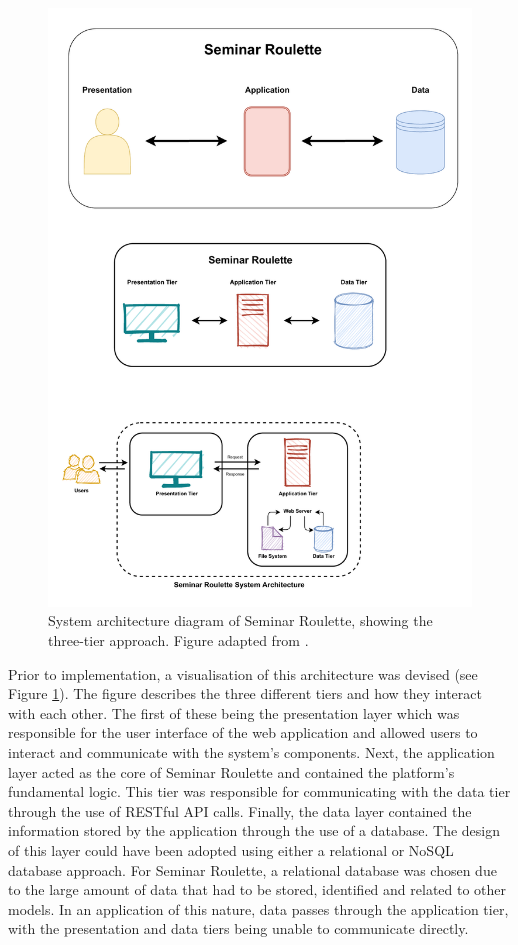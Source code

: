 \documentclass{l4proj}
\begin{document}
\begin{figure}[htb]
    \centering
    \includegraphics[width=0.9\linewidth]{images/seminar_roulette_architecture.pdf}    
    \caption{System architecture diagram of Seminar Roulette, showing the three-tier approach. Figure adapted from \cite{webapplicationarchitecture}.}
    \label{fig:three_tier_architecture} 
\end{figure}

Prior to implementation, a visualisation of this architecture was devised (see Figure \ref{fig:three_tier_architecture}). The figure describes the three different tiers and how they interact with each other. The first of these being the presentation layer which was responsible for the user interface of the web application and allowed users to interact and communicate with the system's components. Next, the application layer acted as the core of Seminar Roulette and contained the platform's fundamental logic. This tier was responsible for communicating with the data tier through the use of RESTful API calls. Finally, the data layer contained the information stored by the application through the use of a database. The design of this layer could have been adopted using either a relational or NoSQL database approach. For Seminar Roulette, a relational database was chosen due to the large amount of data that had to be stored, identified and related to other models. In an application of this nature, data passes through the application tier, with the presentation and data tiers being unable to communicate directly.
\end{document}
